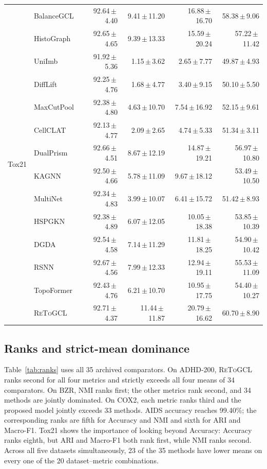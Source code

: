\documentclass[10pt,twocolumn]{article}
\newcommand{\method}{\textsc{ReToGCL}}
\newcommand{\res}[2]{#1\,$\pm$\,#2}
\begin{document}
\begin{longtable}{@{}llrrrr@{}}
\multirow{14}{*}{Tox21}
& BalanceGCL & \res{92.64}{4.40} & \res{9.41}{11.20} & \res{16.88}{16.70} & \res{58.38}{9.06}\\
& HistoGraph & \res{92.65}{4.65} & \res{9.39}{13.33} & \res{15.59}{20.24} & \res{57.22}{11.42}\\
& UniImb & \res{91.92}{5.36} & \res{1.15}{3.62} & \res{2.65}{7.77} & \res{49.87}{4.93}\\
& DiffLift & \res{92.25}{4.76} & \res{1.68}{4.77} & \res{3.40}{9.15} & \res{50.10}{5.50}\\
& MaxCutPool & \res{92.38}{4.80} & \res{4.63}{10.70} & \res{7.54}{16.92} & \res{52.15}{9.61}\\
& CellCLAT & \res{92.13}{4.77} & \res{2.09}{2.65} & \res{4.74}{5.33} & \res{51.34}{3.11}\\
& DualPrism & \res{92.66}{4.51} & \res{8.67}{12.19} & \res{14.87}{19.21} & \res{56.97}{10.80}\\
& KAGNN & \res{92.50}{4.66} & \res{5.78}{11.09} & \res{9.67}{18.12} & \res{53.49}{10.50}\\
& MultiNet & \res{92.34}{4.83} & \res{3.99}{10.07} & \res{6.41}{15.72} & \res{51.42}{8.93}\\
& HSPGKN & \res{92.38}{4.89} & \res{6.07}{12.05} & \res{10.05}{18.38} & \res{53.85}{10.39}\\
& DGDA & \res{92.54}{4.58} & \res{7.14}{11.29} & \res{11.81}{18.25} & \res{54.90}{10.42}\\
& RSNN & \res{92.67}{4.56} & \res{7.99}{12.33} & \res{12.94}{19.11} & \res{55.53}{11.09}\\
& TopoFormer & \res{92.43}{4.76} & \res{6.21}{10.70} & \res{10.95}{17.75} & \res{54.40}{10.27}\\
\rowcolor{topologypurple!45}& \method{} & \res{92.71}{4.37} & \res{11.44}{11.87} & \res{20.79}{16.62} & \res{60.70}{8.90}\\
\end{longtable}
\renewcommand{\arraystretch}{1}
\normalsize
\twocolumn

\subsection{Ranks and strict-mean dominance}

Table~\ref{tab:ranks} uses all 35 archived comparators. On ADHD-200, \method{} ranks second for all four metrics and strictly exceeds all four means of 34 comparators. On BZR, NMI ranks first; the other metrics rank second, and 34 methods are jointly dominated. On COX2, each metric ranks third and the proposed model jointly exceeds 33 methods. AIDS accuracy reaches 99.40\%; the corresponding ranks are fifth for Accuracy and NMI and sixth for ARI and Macro-F1. Tox21 shows the importance of looking beyond Accuracy: Accuracy ranks eighth, but ARI and Macro-F1 both rank first, while NMI ranks second. Across all five datasets simultaneously, 23 of the 35 methods have lower means on every one of the 20 dataset--metric combinations.
\end{document}
